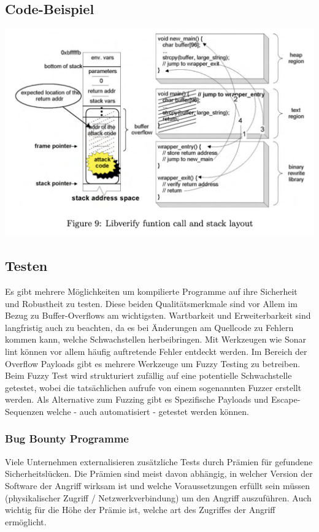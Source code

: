 \subsection{Code-Beispiel}
\begin{center}
    \includegraphics[width=\textwidth,height=0.75\textheight,keepaspectratio]{images/Libverify.png}
\end{center}

\subsection{Testen}
Es gibt mehrere Möglichkeiten um kompilierte Programme auf ihre Sicherheit
und Robustheit zu testen. Diese beiden Qualitätsmerkmale sind vor Allem
im Bezug zu Buffer-Overflows am wichtigsten. Wartbarkeit und Erweiterbarkeit
sind langfristig auch zu beachten, da es bei Änderungen am Quellcode
zu Fehlern kommen kann, welche Schwachstellen herbeibringen.
Mit Werkzeugen wie Sonar lint können vor allem häufig auftretende Fehler entdeckt
werden.
Im Bereich der Overflow Payloads gibt es mehrere Werkzeuge um Fuzzy Testing
zu betreiben. Beim Fuzzy Test wird strukturiert zufällig auf eine
potentielle Schwachstelle getestet, wobei die tatsächlichen aufrufe
von einem sogenannten Fuzzer erstellt werden.
Als Alternative zum Fuzzing gibt es Spezifische Payloads und
Escape-Sequenzen welche - auch automatisiert - getestet werden können.

\subsubsection{Bug Bounty Programme}
Viele Unternehmen externalisieren zusätzliche Tests durch Prämien für gefundene Sicherheitslücken.
Die Prämien sind meist davon abhängig, in welcher Version der Software der Angriff 
wirksam ist und welche Voraussetzungen erfüllt sein müssen (physikalischer Zugriff / Netzwerkverbindung)
um den Angriff auszuführen. Auch wichtig für die Höhe der Prämie ist, welche art des Zugriffes
der Angriff ermöglicht.

